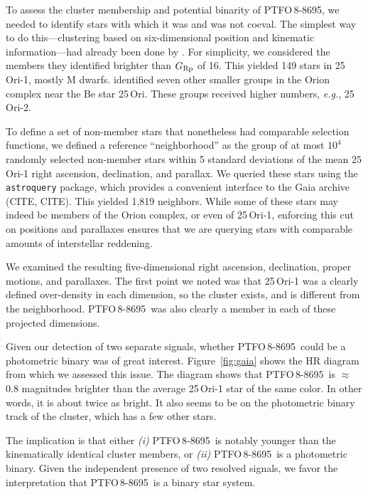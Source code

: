 \documentclass[12pt,twocolumn,tighten]{aastex62}
\newcommand{\ptfo}{PTFO$\,$8-8695}
\begin{document}
\citet{schmidt_direct_2016}
\citet{lee_evidence_2018}

To assess the cluster membership and potential
binarity of \ptfo, we needed to identify stars with which it was and was
not coeval.  The simplest way to do this---clustering based on
six-dimensional position and kinematic information---had already been
done by \citet{kounkel_apogee2_2018}.  For simplicity, we considered
the members they identified brighter than $G_{\rm Rp}$ of 16.  This
yielded 149 stars in 25$\,$Ori-1, mostly M dwarfs.
\citet{kounkel_apogee2_2018} identified seven other smaller
groups in the Orion complex near the Be star 25$\,$Ori. These groups
received higher numbers, {\it e.g.}, 25$\,$Ori-2.

To define a set of non-member stars that nonetheless had comparable selection
functions, we defined a reference ``neighborhood'' as the group of at
most $10^4$ randomly selected non-member stars within 5 standard
deviations of the mean 25$\,$Ori-1 right ascension, declination, and
parallax.  We queried these stars using the \texttt{astroquery}
package, which provides a convenient interface to the Gaia archive
(CITE, CITE).  This yielded 1{,}819 neighbors.  While some of
these stars may indeed be members of the Orion complex, or even of
25$\,$Ori-1, enforcing this cut on positions and parallaxes ensures
that we are querying stars with comparable amounts of interstellar
reddening.

We examined the resulting five-dimensional right ascension,
declination, proper motions, and parallaxes.  The first point we noted
was that 25$\,$Ori-1 was a clearly defined over-density in each
dimension, so the cluster exists, and is different from the
neighborhood.  \ptfo\ was also clearly a member in each of these
projected dimensions.

Given our detection of two separate signals, whether
\ptfo\ could be a photometric binary was of great interest.
Figure~\ref{fig:gaia} shows the HR diagram from which we assessed
this issue.
The diagram shows that \ptfo\ is $\approx$0.8 magnitudes brighter than the average
25$\,$Ori-1 star of the same color.
In other words, it is about twice as bright.
It also seems to be on the photometric binary track of the cluster, which has a few other stars.

The implication is that either 
{\it (i)} \ptfo\ is notably younger than the kinematically identical cluster members, or
{\it (ii)} \ptfo\ is a photometric binary.
Given the independent presence of two resolved signals,
we favor the interpretation that \ptfo\ is a binary star system.
\end{document}
